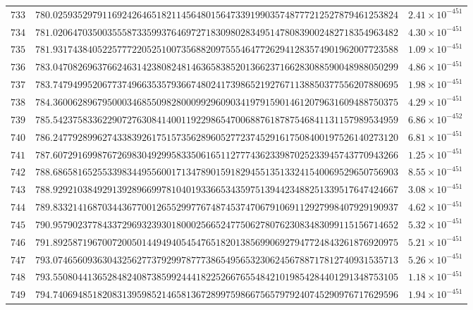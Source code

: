 \documentclass[12pt,reqno]{amsart}
\theoremstyle{remark}
\begin{document}
\begin{longtable}{clc}
$733$ & $780.0259352979116924264651821145648015647339199035748777212527879461253824$ & $2.41\times 10^{-451}$ \\
$734$ & $781.0206470350035558733599376469727183098028349514780839002482718354963482$ & $4.30\times 10^{-451}$ \\
$735$ & $781.9317438405225777220525100735688209755546477262941283574901962007723588$ & $1.09\times 10^{-451}$ \\
$736$ & $783.0470826963766246314238082481463658385201366237166283088590048988050299$ & $4.86\times 10^{-451}$ \\
$737$ & $783.7479499520677374966353579366748024173986521927671138850377556207880695$ & $1.98\times 10^{-451}$ \\
$738$ & $784.3600628967950003468550982800099296090341979159014612079631609488750375$ & $4.29\times 10^{-451}$ \\
$739$ & $785.5423758336229072763084140011922986547006887618787546841131157989534959$ & $6.86\times 10^{-452}$ \\
$740$ & $786.2477928996274338392617515735628960527723745291617508400197526140273120$ & $6.81\times 10^{-451}$ \\
$741$ & $787.6072916998767269830492995833506165112777436233987025233945743770943266$ & $1.25\times 10^{-451}$ \\
$742$ & $788.6865816525533983449556001713478901591829455135133241540069529650756903$ & $8.55\times 10^{-451}$ \\
$743$ & $788.9292103849291392896699781040193366534359751394423488251339517647424667$ & $3.08\times 10^{-451}$ \\
$744$ & $789.8332141687034436770012655299776748745374706791069112927998407929190937$ & $4.62\times 10^{-451}$ \\
$745$ & $790.9579023778433729693239301800025665247750627807623083483099115156714652$ & $5.32\times 10^{-451}$ \\
$746$ & $791.8925871967007200501449494054547651820138569906927947724843261876920975$ & $5.21\times 10^{-451}$ \\
$747$ & $793.0746560936304325627737929978777386549565323062456788717812740931535713$ & $5.26\times 10^{-451}$ \\
$748$ & $793.5508044136528482408738599244418225266765548421019854284401291348753105$ & $1.18\times 10^{-451}$ \\
$749$ & $794.7406948518208313959852146581367289975986675657979240745290976717629596$ & $1.94\times 10^{-451}$ \\

\end{longtable}
\end{document}
